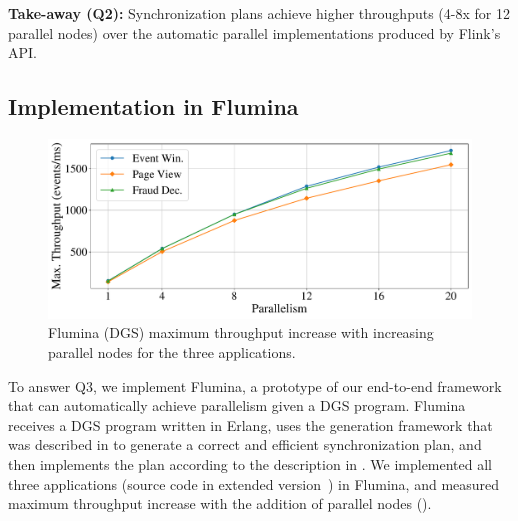 \begin{takeaway}
\textbf{Take-away (Q2):}
Synchronization plans achieve higher throughputs (4-8x for 12 parallel nodes) over the automatic parallel implementations produced by Flink's API.
\end{takeaway}

\subsection{Implementation in Flumina}
\label{dgs:ssec:eval-prototype-performance}

\begin{figure}[t]
  \centering
  \includegraphics[width=0.8\columnwidth]{figures/dgs/flumina_max_throughput_scaleup.pdf}

  \caption{Flumina (DGS) maximum throughput increase with increasing parallel nodes for the three applications.
  }
  \label{dgs:fig:flumina-scaling}
\end{figure}

To answer Q3, we implement Flumina,
a prototype of our end-to-end framework that can automatically achieve parallelism given a DGS program.
Flumina receives a DGS program written in Erlang,
uses the generation framework that was described in  to generate a correct and efficient synchronization plan,
and then implements the plan according to the description in .
We implemented all three applications (source code in extended version~\cite{flumina-arxiv})
in Flumina, and measured maximum throughput increase with the addition of parallel nodes
().

